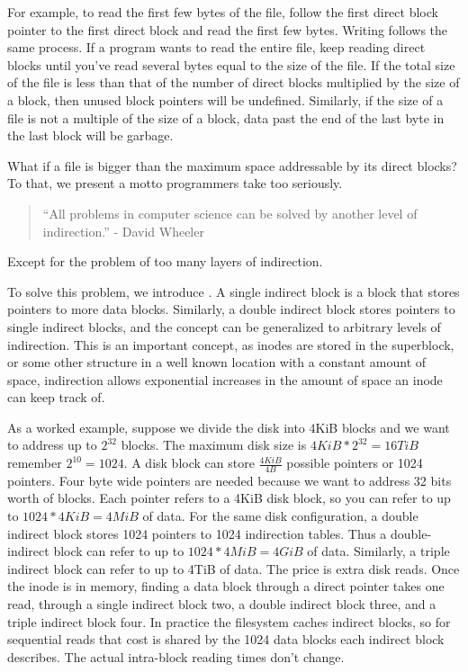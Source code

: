 For example, to read the first few bytes of the file, follow the first direct block pointer to the first direct block and read the first few bytes.
Writing follows the same process.
If a program wants to read the entire file, keep reading direct blocks until you've read several bytes equal to the size of the file.
If the total size of the file is less than that of the number of direct blocks multiplied by the size of a block, then unused block pointers will be undefined.
Similarly, if the size of a file is not a multiple of the size of a block, data past the end of the last byte in the last block will be garbage.

What if a file is bigger than the maximum space addressable by its direct blocks?
To that, we present a motto programmers take too seriously.

\begin{quote}
``All problems in computer science can be solved by another level of indirection.'' - David Wheeler
\end{quote}

Except for the problem of too many layers of indirection.

To solve this problem, we introduce .
A single indirect block is a block that stores pointers to more data blocks.
Similarly, a double indirect block stores pointers to single indirect blocks, and the concept can be generalized to arbitrary levels of indirection.
This is an important concept, as inodes are stored in the superblock, or some other structure in a well known location with a constant amount of space, indirection allows exponential increases in the amount of space an inode can keep track of.

As a worked example, suppose we divide the disk into 4KiB blocks and we want to address up to $2^{32}$ blocks.
The maximum disk size is $4KiB *2^{32} = 16TiB$ remember $2^{10} = 1024$.
A disk block can store $\frac{4KiB}{4B}$ possible pointers or 1024 pointers.
Four byte wide pointers are needed because we want to address 32 bits worth of blocks.
Each pointer refers to a 4KiB disk block, so you can refer to up to $1024*4KiB = 4MiB$ of data.
For the same disk configuration, a double indirect block stores 1024 pointers to 1024 indirection tables.
Thus a double-indirect block can refer to up to $1024 * 4MiB = 4GiB$ of data.
Similarly, a triple indirect block can refer to up to 4TiB of data.
The price is extra disk reads.
Once the inode is in memory, finding a data block through a direct pointer takes one read, through a single indirect block two, a double indirect block three, and a triple indirect block four.
In practice the filesystem caches indirect blocks, so for sequential reads that cost is shared by the 1024 data blocks each indirect block describes.
The actual intra-block reading times don't change.

